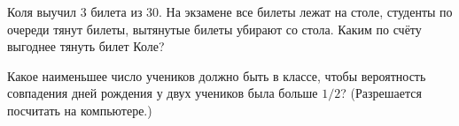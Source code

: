 \documentclass[a4paper,12pt]{article}
\begin{document}
Коля выучил 3 билета из 30. На экзамене все билеты
лежат на столе, студенты
по очереди тянут билеты, вытянутые билеты убирают со стола.
Каким по счёту выгоднее тянуть билет Коле? %



Какое наименьшее число учеников должно быть в классе, чтобы вероятность
совпадения дней рождения у двух учеников была больше $1/2$?
(Разрешается посчитать на компьютере.)












\end{document}
